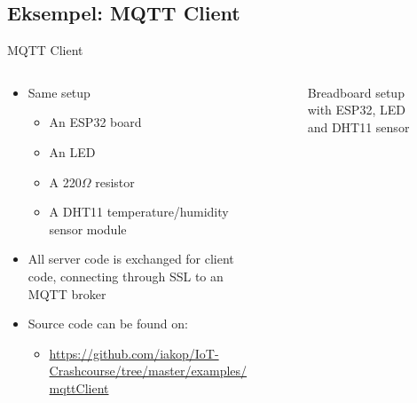 \documentclass[aspectratio=169]{beamer}
\begin{document}
\subsection{Eksempel: MQTT Client}
\begin{frame}{MQTT Client}
\begin{columns}
	\begin{column}{0.6\textwidth}
		\begin{textBox}
		\begin{itemize}
			\item Same setup
			\begin{itemize}
				\item An ESP32 board
				\item An LED
				\item A 220{\textsf{$\Omega$}} resistor
				\item A DHT11 temperature/humidity sensor module
			\end{itemize}
			\item All server code is exchanged for client code, connecting through SSL to an MQTT broker
			\item Source code can be found on:
			\begin{itemize}
				\item \tiny\url{https://github.com/iakop/IoT-Crashcourse/tree/master/examples/mqttClient}
			\end{itemize}
		\end{itemize}
		\end{textBox}
	\end{column}
	\begin{column}{0.4\textwidth}
		\centering
		\begin{figure}
  			
  			\caption{Breadboard setup with ESP32, LED and DHT11 sensor}
  			\label{fig:esp32-led-dht11-2}
		\end{figure}
	\end{column}
\end{columns}
\end{frame}
\end{document}
